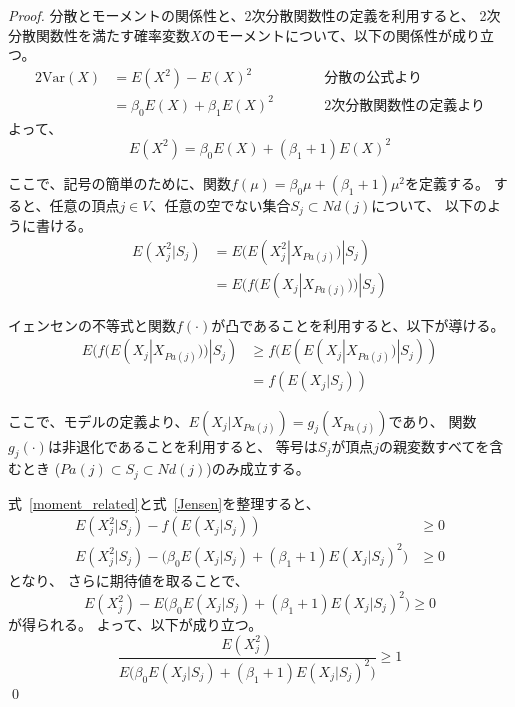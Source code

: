 \begin{proof}
  分散とモーメントの関係性と、2次分散関数性の定義を利用すると、
  2次分散関数性を満たす確率変数$X$のモーメントについて、以下の関係性が成り立つ。
  \begin{alignat*}{2}
    \mathrm{Var}(X) &= E(X^2) - E(X)^2 & \qquad & \text{分散の公式より} \\
                    &= \beta_0 E(X) + \beta_1 E(X)^2 && \text{2次分散関数性の定義より}
  \end{alignat*}
  よって、
  \begin{equation*}
    E(X^2) = \beta_0 E(X) + (\beta_1 + 1) E(X)^2
  \end{equation*}

  ここで、記号の簡単のために、関数$f(\mu) = \beta_0 \mu + (\beta_1 + 1)\mu^2$を定義する。
  すると、任意の頂点$j \in V$、任意の空でない集合$S_j \subset \mathit{Nd}(j)$について、
  以下のように書ける。
  \begin{equation}
    \begin{split}
      E(X_j^2 | S_j) &= E(E(X_j^2 | X_{Pa(j)}) | S_j) \\
                     &= E(f(E(X_j | X_{Pa(j)})) | S_j)
      \label{moment_related}
    \end{split}
  \end{equation}

  イェンセンの不等式と関数$f(\cdot)$が凸であることを利用すると、以下が導ける。
  \begin{equation}
    \begin{split}
      E(f(E(X_j | X_{Pa(j)})) | S_j) & \geq
      f(E(E(X_j | X_{Pa(j)}) | S_j)) \\
      &= f(E(X_j | S_j))
      \label{Jensen}
    \end{split}
  \end{equation}

  ここで、モデルの定義より、$E(X_j | X_{Pa(j)}) = g_j(X_{Pa(j)})$であり、
  関数$g_j(\cdot)$は非退化であることを利用すると、
  等号は$S_j$が頂点$j$の親変数すべてを含むとき
  ($Pa(j) \subset S_j \subset \mathit{Nd}(j)$)のみ成立する。

  式~\eqref{moment_related}と式~\eqref{Jensen}を整理すると、
  \begin{equation*}
    \begin{split}
      E(X_j^2 | S_j) - f(E(X_j | S_j)) & \geq 0 \\
      E(X_j^2 | S_j) - \bigl( \beta_0 E(X_j | S_j) +
      (\beta_1 + 1) E(X_j | S_j)^2 \bigl) & \geq 0
    \end{split}
  \end{equation*}
  となり、
  さらに期待値を取ることで、
  \begin{equation*}
    E(X_j^2) - E\bigl(\beta_0 E(X_j | S_j) + (\beta_1 + 1) E(X_j | S_j)^2 \bigl) \geq 0
  \end{equation*}
  が得られる。 よって、以下が成り立つ。
  \begin{equation*}
    \frac{E(X_j^2)}
    {E\bigl( \beta_0 E(X_j | S_j) + (\beta_1 + 1) E(X_j | S_j)^2 \bigl)}
    \geq 1
  \end{equation*}
  \qed

\end{proof}

